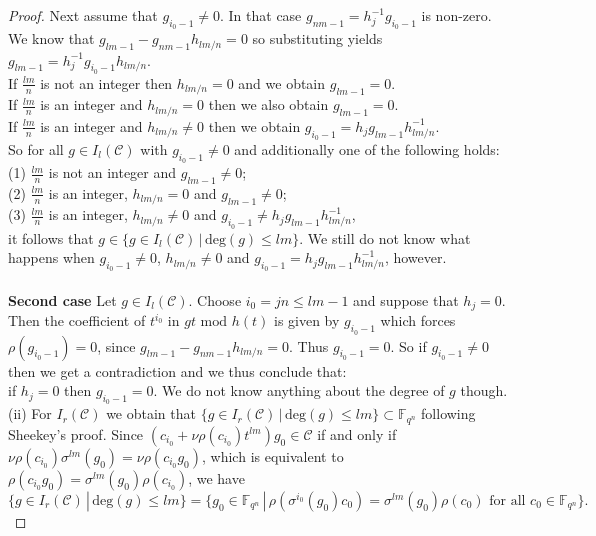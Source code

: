 \documentclass[12pt]{amsart}
\theoremstyle{plain}
\theoremstyle{definition}
\numberwithin{equation}{section}
\numberwithin{figure}{section}
\begin{document}
\begin{proof}
 Next assume that $g_{i_0-1}\not=0$. In that case  $g_{nm-1}=h_j^{-1} g_{i_0-1}$ is non-zero. We know that $g_{lm-1}-g_{nm-1}h_{lm/n}=0 $ so substituting yields $g_{lm-1}=h_j^{-1} g_{i_0-1}h_{lm/n} $.
\\
If $\frac{lm}{n}$ is not an integer then $h_{lm/n} =0$ and we obtain $g_{lm-1}=0 $.
\\
If $\frac{lm}{n}$ is  an integer and $h_{lm/n} =0$ then we also obtain $g_{lm-1}=0 $.
\\
If $\frac{lm}{n}$ is  an integer and $h_{lm/n}\not =0$ then we  obtain
$ g_{i_0-1}=h_j g_{lm-1}h_{lm/n}^{-1}$.
\\
  So for all
$g \in  I_l(\mathcal{C})$ with $g_{i_0-1}\not=0$ and additionally one of the following holds:
\\ (1) $\frac{lm}{n}$ is not an integer and  $g_{lm-1}\not=0 $;
\\ (2) $\frac{lm}{n}$ is  an integer, $h_{lm/n} =0$  and  $g_{lm-1}\not=0 $;
\\ (3)  $\frac{lm}{n}$ is  an integer, $h_{lm/n}\not =0$ and $ g_{i_0-1}\not =h_j g_{lm-1}h_{lm/n}^{-1}$,
\\
 it follows that $g\in \{ g\in I_l(\mathcal{C}) \,|\, \text{deg}(g)\leq lm\rbrace$.
We still do not know what happens when $g_{i_0-1}\not=0$,  $h_{lm/n}\not =0$ and $ g_{i_0-1} =h_j g_{lm-1}h_{lm/n}^{-1}$, however.
\\
\\ {\bf Second case} Let $g\in I_l(\mathcal{C})$.
Choose $i_0=jn\leq lm-1$ and suppose that $h_j=0$. Then the coefficient of $t^{i_0}$ in $gt \text{ mod } h(t)$
is given by
$g_{i_0-1}$ which forces  $\rho(g_{i_0-1})=0$, since $g_{lm-1}-g_{nm-1}h_{lm/n}=0 $. Thus $g_{i_0-1}=0$.
So if  $g_{i_0-1}\not=0$ then we get a contradiction and we thus conclude that:
\\ if $h_j=0$ then $g_{i_0-1}=0$. We do not know anything about the degree of $g$ though.
 \\ (ii)
For $I_r(\mathcal{C})$  we obtain that $\lbrace g\in I_r(\mathcal{C}) \,|\, \text{deg}(g)\leq lm\rbrace \subset \mathbb{F}_{q^n}$ following Sheekey's proof. Since $(c_{i_0}+\nu\rho(c_{i_0})t^{lm}) g_0 \in \mathcal{C}$ if and only if $\nu\rho(c_{i_0}) \sigma^{lm}(g_0)=\nu\rho(c_{i_0}g_0)$, which is equivalent to $\rho(c_{i_0}g_0)= \sigma^{lm}(g_0) \rho(c_{i_0}) $, we have
$$\lbrace g\in I_r(\mathcal{C}) \,|\, \text{deg}(g)\leq lm\rbrace= \lbrace g_0\in \mathbb{F}_{q^n} \,|\, \rho(\sigma^{i_0}(g_0) c_0) = \sigma^{lm}(g_0)\rho(c_0)
\text{ for all } c_0\in \mathbb{F}_{q^n}\rbrace.$$


\end{proof}
\end{document}
